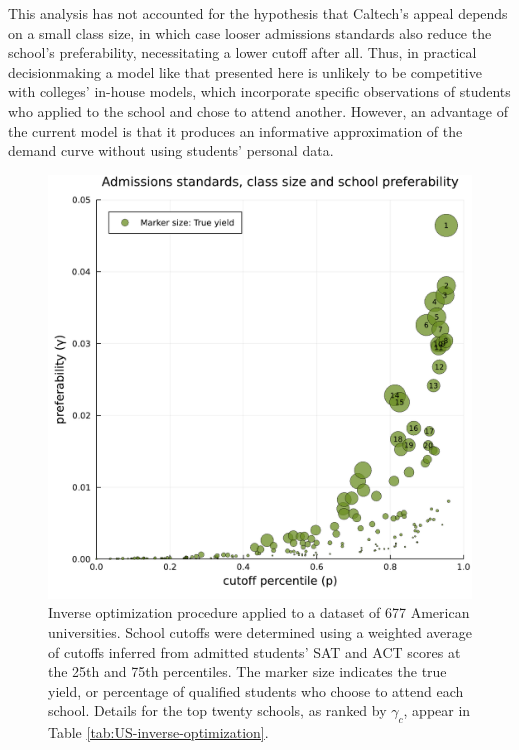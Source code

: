 \documentclass[12pt]{article}
\theoremstyle{definition}
\begin{document}
This analysis has not accounted for the hypothesis that Caltech's appeal depends on a small class size, in which case looser admissions standards also reduce the school's preferability, necessitating a lower cutoff after all. Thus, in practical decisionmaking a model like that presented here is unlikely to be competitive with colleges' in-house models, which incorporate specific observations of students who applied to the school and chose to attend another. However, an advantage of the current model is that it produces an informative approximation of the demand curve without using students' personal data. %

\begin{figure}
\begin{center}\includegraphics[width=\linewidth, ]{plots/US-cutoff-gamma.pdf}\end{center}
\captionsetup{singlelinecheck=off}
    \caption[.]{Inverse optimization procedure applied to a dataset of 677 American universities. School cutoffs were determined using a weighted average of cutoffs inferred from admitted students' SAT and ACT scores at the 25th and 75th percentiles. The marker size indicates the true yield, or percentage of qualified students who choose to attend each school. Details for the top twenty schools, as ranked by $\gamma_c$, appear in Table \ref{tab:US-inverse-optimization}.}
\label{US-cutoff-gamma}
\end{figure}
\end{document}
